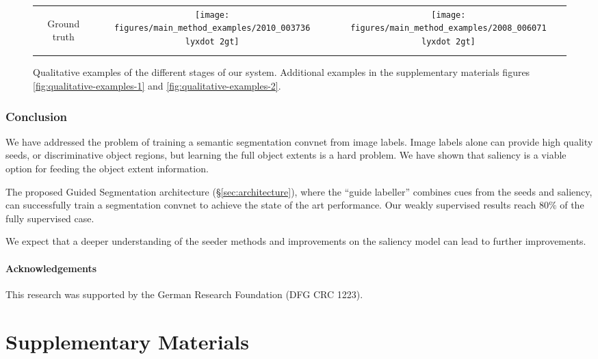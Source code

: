 \documentclass[british,10pt,twocolumn,letterpaper]{article}
\providecommand{\tabularnewline}{\\}
\newcommand{\lyxdot}{.}
\begin{document}
\begin{figure}
\begin{centering}
\begin{tabular}{ccc}
\begin{turn}{90}
Ground truth
\end{turn} & \texttt{[image: figures/main\_method\_examples/2010\_003736\\lyxdot 2gt]} & \texttt{[image: figures/main\_method\_examples/2008\_006071\\lyxdot 2gt]}\tabularnewline
\end{tabular}
\par\end{centering}
\caption{\label{fig:qualitative-examples}Qualitative examples of the different
stages of our system. Additional examples in the supplementary
materials figures \ref{fig:qualitative-examples-1} and \ref{fig:qualitative-examples-2}.}
\end{figure}



\section{\label{sec:Conclusion}Conclusion}

\noindent
We have addressed the problem of training a semantic segmentation
convnet from image labels. Image labels alone can provide high quality
seeds, or discriminative object regions, but learning the full object
extents is a hard problem. We have shown that saliency is a viable
option for feeding the object extent information.

The proposed Guided Segmentation architecture (\S\ref{sec:architecture}),
where the ``guide labeller'' combines cues from the seeds and saliency,
can successfully train a segmentation convnet to achieve the state
of the art performance. Our weakly supervised results reach $80\%$
of the fully supervised case.

We expect that a deeper understanding of the seeder methods and improvements
on the saliency model can lead to further improvements. 

\subsection*{Acknowledgements}

\noindent
This research was supported by the German Research Foundation (DFG CRC
1223).








\newpage
\appendix



\part*{Supplementary Materials}
\end{document}

